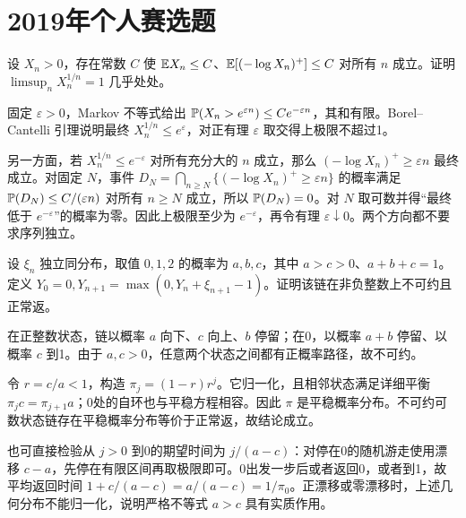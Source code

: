 \section{2019年个人赛选题}
\begin{example}[原题1：正随机变量的根上极限]\label{yau:2019-1}
设 $X_n>0$，存在常数 $C$ 使 $\mathbb E X_n\le C$、$\mathbb E[(-\log X_n)^+]\le C$ 对所有 $n$ 成立。证明 $\limsup_nX_n^{1/n}=1$ 几乎处处。
\end{example}
\begin{solve}
固定 $\varepsilon>0$，Markov 不等式给出 $\mathbb P(X_n>e^{\varepsilon n})\le Ce^{-\varepsilon n}$，其和有限。Borel--Cantelli 引理说明最终 $X_n^{1/n}\le e^\varepsilon$，对正有理 $\varepsilon$ 取交得上极限不超过1。

另一方面，若 $X_n^{1/n}\le e^{-\varepsilon}$ 对所有充分大的 $n$ 成立，那么 $(-\log X_n)^+\ge\varepsilon n$ 最终成立。对固定 $N$，事件 $D_N=\bigcap_{n\ge N}\{(-\log X_n)^+\ge\varepsilon n\}$ 的概率满足 $\mathbb P(D_N)\le C/(\varepsilon n)$ 对所有 $n\ge N$ 成立，所以 $\mathbb P(D_N)=0$。对 $N$ 取可数并得“最终低于 $e^{-\varepsilon}$”的概率为零。因此上极限至少为 $e^{-\varepsilon}$，再令有理 $\varepsilon\downarrow0$。两个方向都不要求序列独立。
\end{solve}

\begin{example}[原题2：反射随机游走的正常返性]\label{yau:2019-2}
设 $\xi_n$ 独立同分布，取值 $0,1,2$ 的概率为 $a,b,c$，其中 $a>c>0$、$a+b+c=1$。定义 $Y_0=0,Y_{n+1}=\max(0,Y_n+\xi_{n+1}-1)$。证明该链在非负整数上不可约且正常返。
\end{example}
\begin{solve}
在正整数状态，链以概率 $a$ 向下、$c$ 向上、$b$ 停留；在0，以概率 $a+b$ 停留、以概率 $c$ 到1。由于 $a,c>0$，任意两个状态之间都有正概率路径，故不可约。

令 $r=c/a<1$，构造 $\pi_j=(1-r)r^j$。它归一化，且相邻状态满足详细平衡 $\pi_jc=\pi_{j+1}a$；0处的自环也与平稳方程相容。因此 $\pi$ 是平稳概率分布。不可约可数状态链存在平稳概率分布等价于正常返，故结论成立。

也可直接检验从 $j>0$ 到0的期望时间为 $j/(a-c)$：对停在0的随机游走使用漂移 $c-a$，先停在有限区间再取极限即可。0出发一步后或者返回0，或者到1，故平均返回时间 $1+c/(a-c)=a/(a-c)=1/\pi_0$。正漂移或零漂移时，上述几何分布不能归一化，说明严格不等式 $a>c$ 具有实质作用。
\end{solve}

